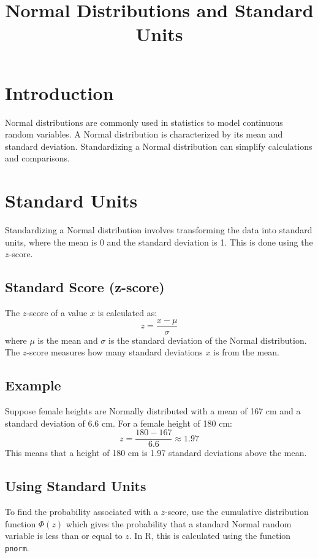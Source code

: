 \documentclass{article}
\begin{document}
\title{Normal Distributions and Standard Units}
\author{}
\date{}
\maketitle

\section{Introduction}
Normal distributions are commonly used in statistics to model continuous random variables. A Normal distribution is characterized by its mean and standard deviation. Standardizing a Normal distribution can simplify calculations and comparisons.

\section{Standard Units}
Standardizing a Normal distribution involves transforming the data into standard units, where the mean is 0 and the standard deviation is 1. This is done using the \( z \)-score.

\subsection{Standard Score (z-score)}
The \( z \)-score of a value \( x \) is calculated as:
\[
z = \frac{x - \mu}{\sigma}
\]
where \( \mu \) is the mean and \( \sigma \) is the standard deviation of the Normal distribution. The \( z \)-score measures how many standard deviations \( x \) is from the mean.

\subsection{Example}
Suppose female heights are Normally distributed with a mean of 167 cm and a standard deviation of 6.6 cm. For a female height of 180 cm:
\[
z = \frac{180 - 167}{6.6} \approx 1.97
\]
This means that a height of 180 cm is 1.97 standard deviations above the mean.

\subsection{Using Standard Units}
To find the probability associated with a \( z \)-score, use the cumulative distribution function \( \Phi(z) \) which gives the probability that a standard Normal random variable is less than or equal to \( z \). In R, this is calculated using the function \texttt{pnorm}.
\end{document}
